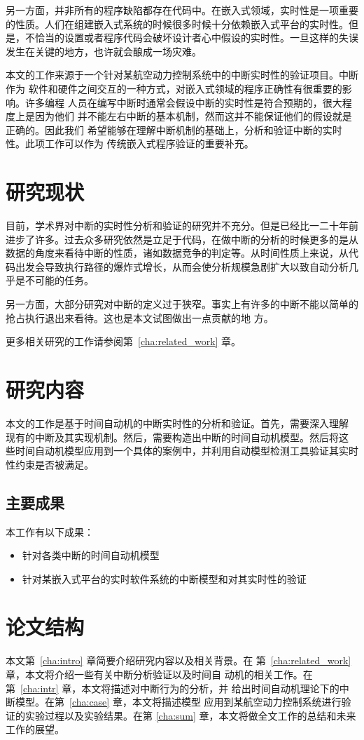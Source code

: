 另一方面，并非所有的程序缺陷都存在代码中。在嵌入式领域，实时性是一项重要
的性质。人们在组建嵌入式系统的时候很多时候十分依赖嵌入式平台的实时性。但
是，不恰当的设置或者程序代码会破坏设计者心中假设的实时性。一旦这样的失误
发生在关键的地方，也许就会酿成一场灾难。

本文的工作来源于一个针对某航空动力控制系统中的中断实时性的验证项目。中断作为
软件和硬件之间交互的一种方式，对嵌入式领域的程序正确性有很重要的影响。许多编程
人员在编写中断时通常会假设中断的实时性是符合预期的，很大程度上是因为他们
并不能左右中断的基本机制，然而这并不能保证他们的假设就是正确的。因此我们
希望能够在理解中断机制的基础上，分析和验证中断的实时性。此项工作可以作为
传统嵌入式程序验证的重要补充。

\section{研究现状}
\label{sec:study}

目前，学术界对中断的实时性分析和验证的研究并不充分。但是已经比一二十年前
进步了许多。过去众多研究依然是立足于代码，在做中断的分析的时候更多的是从
数据的角度来看待中断的性质，诸如数据竞争的判定等。从时间性质上来说，从代
码出发会导致执行路径的爆炸式增长，从而会使分析规模急剧扩大以致自动分析几
乎是不可能的任务。

另一方面，大部分研究对中断的定义过于狭窄。事实上有许多的中断不能以简单的
抢占\pozhehao 执行\pozhehao 退出来看待。这也是本文试图做出一点贡献的地
方。

更多相关研究的工作请参阅第~\ref{cha:related_work} 章。

\section{研究内容}
\label{sec:subject}
本文的工作是基于时间自动机的中断实时性的分析和验证。首先，需要深入理解
现有的中断及其实现机制。然后，需要构造出中断的时间自动机模型。然后将这
些时间自动机模型应用到一个具体的案例中，并利用自动模型检测工具验证其实时
性约束是否被满足。

\subsection{主要成果}
\label{subsec:expectation}

本工作有以下成果：
\begin{itemize}
	\item 针对各类中断的时间自动机模型
	\item 针对某嵌入式平台的实时软件系统的中断模型和对其实时性的验证
\end{itemize}

\section{论文结构}
\label{sec:structure}
本文第~\ref{cha:intro} 章简要介绍研究内容以及相关背景。在
第~\ref{cha:related_work} 章，本文将介绍一些有关中断分析验证以及时间自
动机的相关工作。在第~\ref{cha:intr} 章，本文将描述对中断行为的分析，并
给出时间自动机理论下的中断模型。在第~\ref{cha:case} 章，本文将描述模型
应用到某航空动力控制系统进行验证的实验过程以及实验结果。在第
\ref{cha:sum} 章，本文将做全文工作的总结和未来工作的展望。


